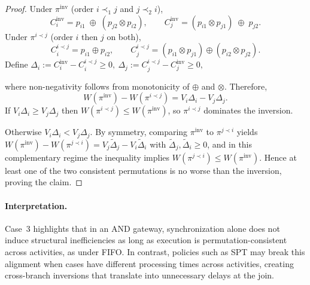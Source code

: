 \documentclass[letterpaper]{article}
\newtheorem{lemma}{Lemma}
\begin{document}
\else
\begin{proof}
Under $\pi^{\mathrm{inv}}$ (order $i\prec_1 j$ and $j\prec_2 i$),
\[
C_i^{\mathrm{inv}} = p_{i1}\;\oplus\;(p_{j2}\otimes p_{i2}),\qquad
C_j^{\mathrm{inv}} = (p_{i1}\otimes p_{j1})\;\oplus\;p_{j2}.
\]
Under $\pi^{i\prec j}$ (order $i$ then $j$ on both),
\[
C_i^{i\prec j} = p_{i1}\oplus p_{i2},\qquad
C_j^{i\prec j} = (p_{i1}\otimes p_{j1})\oplus (p_{i2}\otimes p_{j2}).
\]
Define 
$\Delta_i:=C_i^{\mathrm{inv}}-C_i^{i\prec j}\ge 0 , \
\Delta_j:=C_j^{i\prec j}-C_j^{\mathrm{inv}}\ge 0,$

where non-negativity follows from monotonicity of $\oplus$ and $\otimes$.
Therefore,
\[
W(\pi^{\mathrm{inv}})-W(\pi^{i\prec j})
=V_i\Delta_i - V_j\Delta_j.
\]
If $V_i\Delta_i\ge V_j\Delta_j$ then $W(\pi^{i\prec j})\le W(\pi^{\mathrm{inv}})$,
so $\pi^{i\prec j}$ dominates the inversion.

Otherwise $V_i\Delta_i< V_j\Delta_j$. By symmetry, comparing $\pi^{\mathrm{inv}}$
to $\pi^{j\prec i}$ yields
$W(\pi^{\mathrm{inv}})-W(\pi^{j\prec i})=V_j\widetilde{\Delta}_j-V_i\widetilde{\Delta}_i$
with $\widetilde{\Delta}_j,\widetilde{\Delta}_i\ge 0$, and in this complementary
regime the inequality implies $W(\pi^{j\prec i})\le W(\pi^{\mathrm{inv}})$.
Hence at least one of the two consistent permutations is no worse than the
inversion, proving the claim.
\end{proof}
\fi



\paragraph{Interpretation.}
Case~3 highlights that in an AND gateway, synchronization alone does not induce structural inefficiencies as long as execution is permutation-consistent across activities, as under FIFO. In contrast, policies such as SPT may break this alignment when cases have different processing times across activities, creating cross-branch inversions that translate into unnecessary delays at the join.






\end{document}
